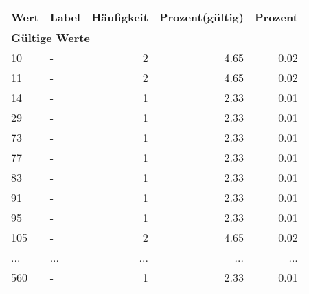      \begin{longtable}{lXrrr}
     \toprule
     \textbf{Wert} & \textbf{Label} & \textbf{Häufigkeit} & \textbf{Prozent(gültig)} & \textbf{Prozent} \\
     \endhead
     \midrule
     \multicolumn{5}{l}{\textbf{Gültige Werte}}\\
        10 & \multicolumn{1}{X}{-} & %
          \num{2} &
          \num[round-mode=places,round-precision=2]{4.65} &
          \num[round-mode=places,round-precision=2]{0.02} \\
        11 & \multicolumn{1}{X}{-} & %
          \num{2} &
          \num[round-mode=places,round-precision=2]{4.65} &
          \num[round-mode=places,round-precision=2]{0.02} \\
        14 & \multicolumn{1}{X}{-} & %
          \num{1} &
          \num[round-mode=places,round-precision=2]{2.33} &
          \num[round-mode=places,round-precision=2]{0.01} \\
        29 & \multicolumn{1}{X}{-} & %
          \num{1} &
          \num[round-mode=places,round-precision=2]{2.33} &
          \num[round-mode=places,round-precision=2]{0.01} \\
        73 & \multicolumn{1}{X}{-} & %
          \num{1} &
          \num[round-mode=places,round-precision=2]{2.33} &
          \num[round-mode=places,round-precision=2]{0.01} \\
        77 & \multicolumn{1}{X}{-} & %
          \num{1} &
          \num[round-mode=places,round-precision=2]{2.33} &
          \num[round-mode=places,round-precision=2]{0.01} \\
        83 & \multicolumn{1}{X}{-} & %
          \num{1} &
          \num[round-mode=places,round-precision=2]{2.33} &
          \num[round-mode=places,round-precision=2]{0.01} \\
        91 & \multicolumn{1}{X}{-} & %
          \num{1} &
          \num[round-mode=places,round-precision=2]{2.33} &
          \num[round-mode=places,round-precision=2]{0.01} \\
        95 & \multicolumn{1}{X}{-} & %
          \num{1} &
          \num[round-mode=places,round-precision=2]{2.33} &
          \num[round-mode=places,round-precision=2]{0.01} \\
        105 & \multicolumn{1}{X}{-} & %
          \num{2} &
          \num[round-mode=places,round-precision=2]{4.65} &
          \num[round-mode=places,round-precision=2]{0.02} \\
       ... & ... & ... & ... & ... \\
        560 & \multicolumn{1}{X}{-} & %
          \num{1} &
          \num[round-mode=places,round-precision=2]{2.33} &
          \num[round-mode=places,round-precision=2]{0.01} \\


\end{longtable}
